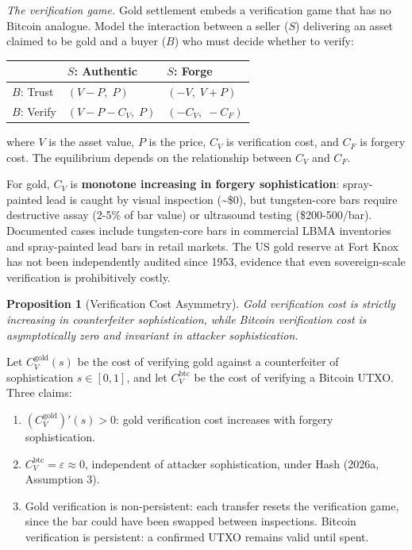 \documentclass[12pt]{article}
\newtheorem{proposition}{Proposition}
\theoremstyle{definition}
\theoremstyle{remark}
\begin{document}
\noindent\emph{The verification game.} Gold settlement embeds a verification game
that has no Bitcoin analogue. Model the interaction between a seller
($S$) delivering an asset claimed to be gold and a buyer ($B$)
who must decide whether to verify:

\begin{table}[h]
\centering
\begin{tabular}{lll}
\toprule
& $S$: Authentic & $S$: Forge \\
\midrule
$B$: Trust & $(V - P,\; P)$ & $(-V,\; V + P)$ \\
$B$: Verify & $(V - P - C_V,\; P)$ & $(-C_V,\; -C_F)$ \\
\bottomrule
\end{tabular}
\end{table}

where $V$ is the asset value, $P$ is the price, $C_V$ is
verification cost, and $C_F$ is forgery cost. The equilibrium
depends on the relationship between $C_V$ and $C_F$.

For gold, $C_V$ is \textbf{monotone increasing in forgery
sophistication}: spray-painted lead is caught by visual inspection
(\textasciitilde\$0), but tungsten-core bars require destructive assay
(2-5\% of bar value) or ultrasound testing (\$200-500/bar). Documented
cases include tungsten-core bars in commercial LBMA inventories and
spray-painted lead bars in retail markets. The US gold reserve at Fort
Knox has not been independently audited since 1953, evidence that even
sovereign-scale verification is prohibitively costly.

\begin{proposition}[Verification Cost Asymmetry]
Gold verification cost is strictly increasing in counterfeiter
sophistication, while Bitcoin verification cost is asymptotically zero
and invariant in attacker sophistication.
\end{proposition}

\noindent Let $C_V^\text{gold}(s)$ be the cost of verifying gold against
a counterfeiter of sophistication $s \in [0, 1]$, and let $C_V^\text{btc}$
be the cost of verifying a Bitcoin UTXO. Three claims:

\begin{enumerate}[label=(\roman*),nosep]
\item $(C_V^\text{gold})'(s) > 0$: gold verification cost increases
  with forgery sophistication.
\item $C_V^\text{btc} = \varepsilon \approx 0$, independent of attacker
  sophistication, under Hash (2026a, Assumption 3).
\item Gold verification is non-persistent: each transfer resets the
  verification game, since the bar could have been swapped between
  inspections. Bitcoin verification is persistent: a confirmed UTXO
  remains valid until spent.
\end{enumerate}
\end{document}
